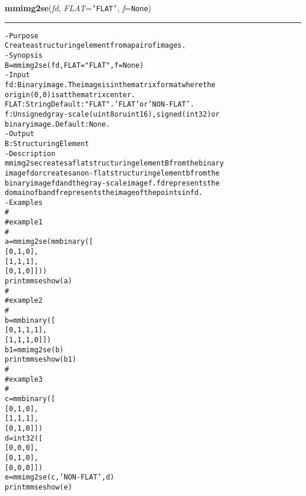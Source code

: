     \label{multireg:num_pymorph:mmimg2se}
    \vspace{0.5ex}

    \begin{boxedminipage}{\textwidth}

    \raggedright \textbf{mmimg2se}(\textit{fd}, \textit{FLAT}=\texttt{'\-F\-L\-A\-T\-'\-}, \textit{f}=\texttt{N\-o\-n\-e\-})

    \vspace{-1.5ex}

    \rule{\textwidth}{0.5\fboxrule}
\begin{alltt}
- Purpose
    Create a structuring element from a pair of images.
- Synopsis
    B = mmimg2se(fd, FLAT="FLAT", f=None)
- Input
    fd:   Binary image. The image is in the matrix format where the
          origin (0,0) is at the matrix center.
    FLAT: String Default: "FLAT". 'FLAT' or 'NON-FLAT'.
    f:    Unsigned gray-scale (uint8 or uint16), signed (int32) or
          binary image. Default: None.
- Output
    B: Structuring Element
- Description
    mmimg2se creates a flat structuring element B from the binary
    image fd or creates a non-flat structuring element b from the
    binary image fd and the gray-scale image f . fd represents the
    domain of b and f represents the image of the points in fd .
- Examples
    \#
    \#   example 1
    \#
    a = mmimg2se(mmbinary([
      [0,1,0],
      [1,1,1],
      [0,1,0]]))
    print mmseshow(a)
    \#
    \#   example 2
    \#
    b = mmbinary([
      [0,1,1,1],
      [1,1,1,0]])
    b1 = mmimg2se(b)
    print mmseshow(b1)
    \#
    \#   example 3
    \#
    c = mmbinary([
      [0,1,0],
      [1,1,1],
      [0,1,0]])
    d = int32([
      [0,0,0],
      [0,1,0],
      [0,0,0]])
    e = mmimg2se(c,'NON-FLAT',d)
    print mmseshow(e)\end{alltt}

    \vspace{1ex}

    \end{boxedminipage}

    \label{multireg:num_pymorph:mminfcanon}
    \vspace{0.5ex}

